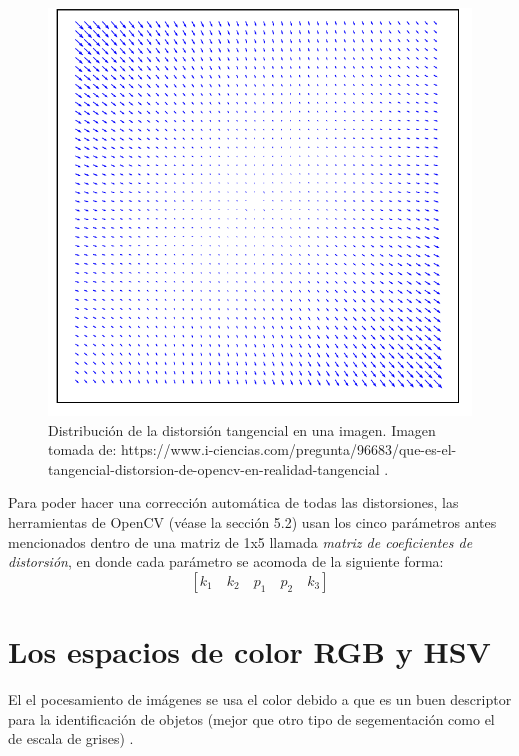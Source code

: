 \begin{figure}
\centering
\includegraphics[scale=0.66]{images/tangential_distortion.png}
\caption{Distribución de la distorsión tangencial en una imagen. Imagen tomada de: https://www.i-ciencias.com/pregunta/96683/que-es-el-tangencial-distorsion-de-opencv-en-realidad-tangencial .}
\label{fig:tangential_distortion}
\end{figure}

Para poder hacer una corrección automática de todas las distorsiones, las herramientas de OpenCV (véase la sección 5.2) usan los cinco parámetros antes mencionados dentro de una matriz de 1x5 llamada \textit{matriz de coeficientes de distorsión}, en donde cada parámetro se acomoda de la siguiente forma:
\[[k_1 \quad k_2 \quad p_1 \quad p_2 \quad k_3]\]
	\section{Los espacios de color RGB y HSV}
El el pocesamiento de imágenes se usa el color debido a que es un buen descriptor para la identificación de objetos (mejor que otro tipo de segementación como el de escala de grises) \cite{gonzalez2002digital}.
